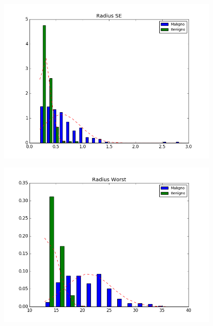 \documentclass[11pt,a4paper]{article}
\numberwithin{equation}{section}
\begin{document}
\begin{itemize}
\begin{figure}[H]
\centering
\begin{minipage}{.5\textwidth}
  \centering
  \includegraphics[width=\linewidth]{../img/hist/radius_se}
  \label{fig:test1}
\end{minipage}%
\begin{minipage}{.5\textwidth}
  \centering
  \includegraphics[width=\linewidth]{../img/hist/radius_worst}
  \label{fig:test2}
\end{minipage}
\end{figure}


\end{itemize}
\end{document}
